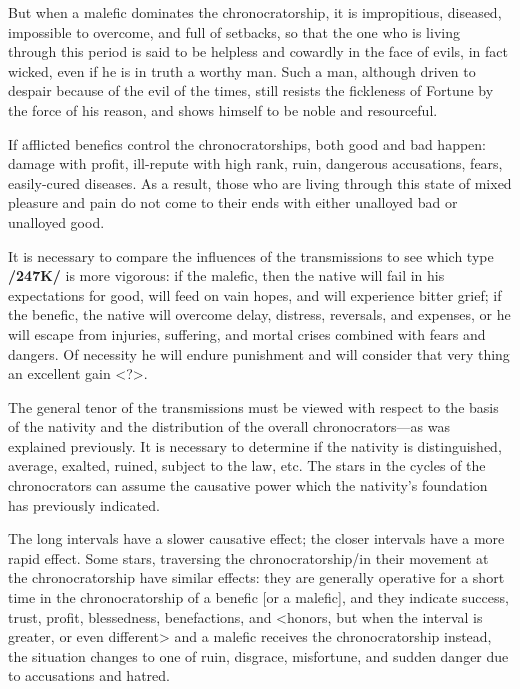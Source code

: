 But when a malefic dominates the chronocratorship, it is impropitious, diseased, impossible to overcome, and full of setbacks, so that the one who is living through this period is said to be helpless and cowardly in the face of evils, in fact wicked, even if he is in truth a worthy man. Such a man, although driven to despair because of the evil of the times, still resists the fickleness of Fortune by the force of his
reason, and shows himself to be noble and resourceful. 

If \mnbm afflicted benefics control the chronocratorships, both good and bad happen: damage with profit, ill-repute with high rank, ruin, dangerous accusations, fears, easily-cured diseases. As a result, those who are living through this state of mixed pleasure and pain do not come to their ends with either unalloyed bad or unalloyed good.

It is necessary to compare the influences of the transmissions to see which type \textbf{/247K/} is more vigorous: if the malefic, then the native will fail in his expectations for good, will feed on vain hopes, and
will experience bitter grief; if the benefic, the native will overcome delay, distress, reversals, and expenses, or he will escape from injuries, suffering, and mortal crises combined with fears and dangers. Of necessity he will endure punishment and will consider that very thing an excellent gain <?>. 

The  general tenor of the transmissions must be viewed with respect to the basis of the nativity and the distribution of the overall chronocrators—as was explained previously. It is necessary to determine if the nativity is distinguished, average, exalted, ruined, subject to the law, etc. The stars in the cycles of the chronocrators can assume the
causative power which the nativity’s foundation has previously indicated.

The long intervals have a slower causative effect; the closer intervals have a more rapid effect. Some stars, traversing the chronocratorship/in their movement at the chronocratorship have similar effects: they
are generally operative for a short time in the chronocratorship of a benefic [or a malefic], and they indicate success, trust, profit, blessedness, benefactions, and <honors, but when the interval is greater, or even different> and a malefic receives the chronocratorship instead, the situation changes to one of ruin, disgrace,
misfortune, and sudden danger due to accusations and hatred. 


